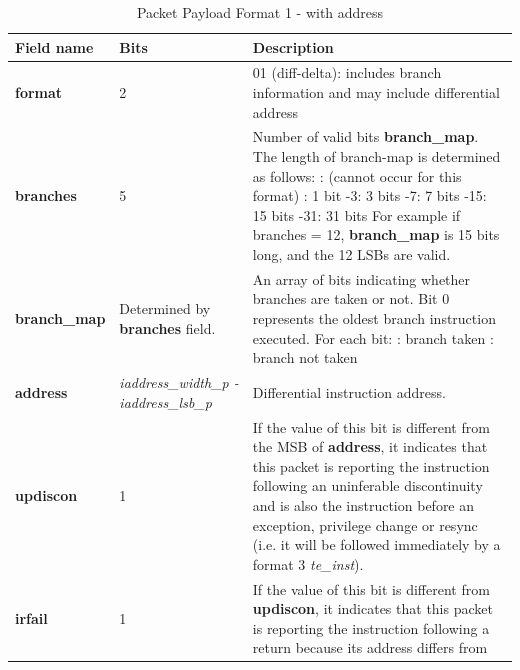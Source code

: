 \begin{table}[htp]
  \centering
  \caption{Packet Payload Format 1 - with address}
  \label{tab:te_inst0-1-addr}
  \begin{tabulary}{\textwidth}{|l|p{35mm}|p{80mm}|}
    \hline
    {\bf Field name} & {\bf Bits} & {\bf Description} \\
    \hline
    \textbf{format}	& 2	& 01 (diff-delta): includes branch information and may include differential address\\
    \hline
    \textbf{branches} & 5 & Number of valid bits \textbf{branch\_map}. The length of branch-map is determined as follows: :	   (cannot occur for this format) :	   1 bit -3:   3 bits -7:   7 bits -15:  15 bits -31: 31 bits \newline
    For example if branches = 12, \textbf{branch\_map} is 15 bits long, and the 12 LSBs are valid. \\
    \hline
    \textbf{branch\_map} & Determined by \newline 
                 \textbf{branches} field. & 
                 An array of bits indicating whether branches are taken or not.\newline
    Bit 0 represents the oldest branch instruction executed.   For each bit: : branch taken : branch not taken \\
    \hline
    \textbf{address}	& \textit {iaddress\_width\_p - iaddress\_lsb\_p} & 
                Differential instruction address.\\
    \hline
    \textbf{updiscon}	& 1 & 
                If the value of this bit is different from the MSB of \textbf{address}, it indicates that this 
                packet is reporting the instruction following an uninferable discontinuity and is also the 
                instruction before an exception, privilege change or resync 
                (i.e. it will be followed immediately by a format 3 \textit{te\_inst}).\\
    \hline
    \textbf{irfail}	& 1 & 
                If the value of this bit is different from \textbf{updiscon}, it indicates that this
                packet is reporting the instruction following a return because its address differs from 

\end{tabulary}
\end{table}
